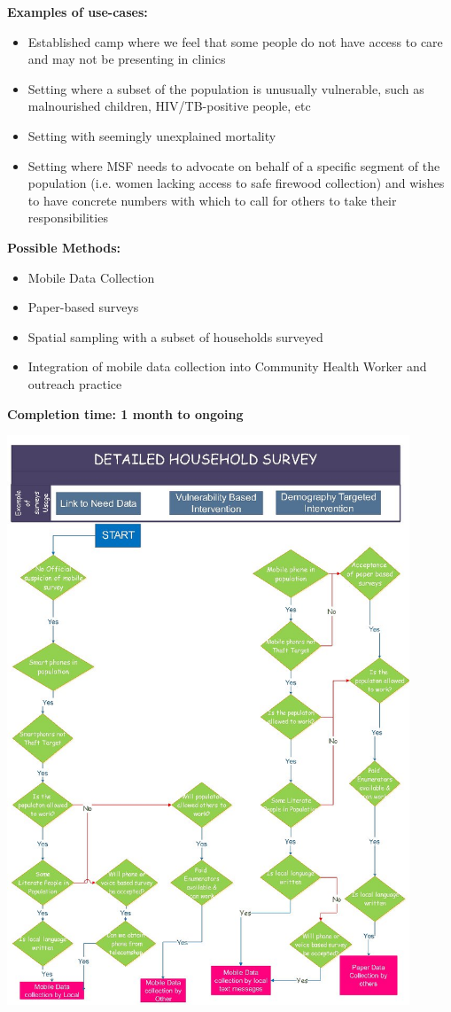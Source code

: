 \documentclass[a4paper,12pt,twoside]{article}
\begin{document}
\noindent
\textbf{Examples of use-cases:}
\begin{itemize}
    \item Established camp where we feel that some people do not have access to care and may not be presenting in clinics
    \item Setting where a subset of the population is unusually vulnerable, such as malnourished children, HIV/TB-positive people, etc
    \item Setting with seemingly unexplained mortality
    \item Setting where MSF needs to advocate on behalf of a specific segment of the population (i.e. women lacking access to safe firewood collection) and wishes to have concrete numbers with which to call for others to take their responsibilities
\end{itemize}

\noindent
\textbf{Possible Methods:}
\begin{itemize}
    \item Mobile Data Collection
    \item Paper-based surveys
    \item Spatial sampling with a subset of households surveyed
    \item Integration of mobile data collection into Community Health Worker and outreach practice
\end{itemize}

\noindent
\textbf{Completion time: 1 month to ongoing}

\includegraphics[width=0.9\textwidth]{images/Detailed_Household_Survey.jpeg}
\end{document}
